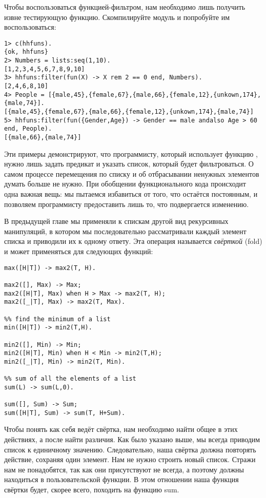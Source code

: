 Чтобы воспользоваться функцией\--фильтром, нам необходимо лишь получить извне тестирующую функцию.
Скомпилируйте модуль  и попробуйте им воспользоваться:
\begin{lstlisting}[style=erlang]
1> c(hhfuns).
{ok, hhfuns}
2> Numbers = lists:seq(1,10).
[1,2,3,4,5,6,7,8,9,10]
3> hhfuns:filter(fun(X) -> X rem 2 == 0 end, Numbers).
[2,4,6,8,10]
4> People = [{male,45},{female,67},{male,66},{female,12},{unkown,174},{male,74}].
[{male,45},{female,67},{male,66},{female,12},{unkown,174},{male,74}]
5> hhfuns:filter(fun({Gender,Age}) -> Gender == male andalso Age > 60 end, People).
[{male,66},{male,74}]
\end{lstlisting}

Эти примеры демонстрируют, что программисту, который использует функцию , нужно лишь задать предикат и указать список, который будет фильтроваться.
О самом процессе перемещения по списку и об отбрасывании ненужных элементов думать больше не нужно.
При обобщении функционального кода происходит одна важная вещь: мы пытаемся избавиться от того, что остаётся постоянным, и позволяем программисту предоставить лишь то, что подвергается изменению.

В предыдущей главе мы применяли к спискам другой вид рекурсивных манипуляций, в котором мы последовательно рассматривали каждый элемент списка и приводили их к одному ответу.
Эта операция называется \emph{свёрткой} (fold) и может применяться для следующих функций:
\begin{lstlisting}[style=erlang]
%% find the maximum of a list
max([H|T]) -> max2(T, H).
 
max2([], Max) -> Max;
max2([H|T], Max) when H > Max -> max2(T, H);
max2([_|T], Max) -> max2(T, Max).
 
%% find the minimum of a list
min([H|T]) -> min2(T,H).
 
min2([], Min) -> Min;
min2([H|T], Min) when H < Min -> min2(T,H);
min2([_|T], Min) -> min2(T, Min).
 
%% sum of all the elements of a list
sum(L) -> sum(L,0).
 
sum([], Sum) -> Sum;
sum([H|T], Sum) -> sum(T, H+Sum).
\end{lstlisting}

Чтобы понять как себя ведёт свёртка, нам необходимо найти общее в этих действиях, а после найти различия.
Как было указано выше, мы всегда приводим список к единичному значению.
Следовательно, наша свёртка должна повторять действие, сохраняя один элемент.
Нам не нужно строить новый список.
Стражи нам не понадобятся, так как они присутствуют не всегда, а поэтому должны находиться в пользовательской функции.
В этом отношении наша функция свёртки будет, скорее всего, походить на функцию sum.

